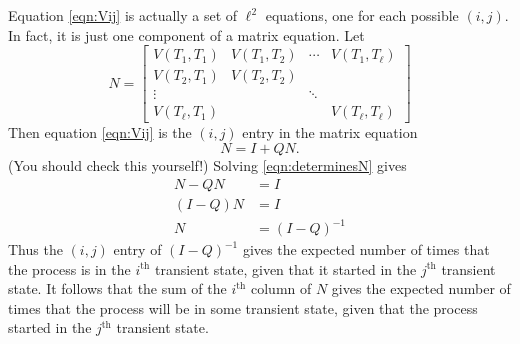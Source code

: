 \documentclass[reqno]{immbook}
\numberwithin{equation}{chapter}
\numberwithin{question}{section}
\numberwithin{theorem}{chapter}
\numberwithin{figure}{chapter}
\theoremstyle{definition}
\begin{document}
Equation \eqref{eqn:Vij} is actually a set of $\ell^2$ equations,
one for each possible $(i,j)$.  In fact, it is just one component
of a matrix equation.
Let
\begin{equation}
   N = \begin{bmatrix}
            V(T_1,T_1) & V(T_1,T_2) & \cdots & V(T_1,T_{\ell}) \\
	    V(T_2,T_1) & V(T_2,T_2) \\
	       \vdots  &  &   \ddots \\
	    V(T_{\ell},T_1) & & & V(T_{\ell},T_{\ell})
       \end{bmatrix}
\end{equation}
Then equation \eqref{eqn:Vij} is the $(i,j)$ entry in the
matrix equation
\begin{equation}
   N = I + QN.
\label{eqn:determinesN}
\end{equation}
(You should check this yourself!)
Solving \eqref{eqn:determinesN} gives
\begin{equation}
\begin{split}
  N-QN & = I \\
  (I-Q)N & = I \\
       N & = (I-Q)^{-1}
\end{split}
\end{equation}
Thus the $(i,j)$ entry of $(I-Q)^{-1}$ gives the expected number
of times that the process is in the $i^{\textrm{th}}$ transient
state, given that it started in the $j^{\textrm{th}}$
transient state.
It follows that the sum of the $i^{\textrm{th}}$ column of $N$
gives the expected number of times that the process will be in 
some transient state, given that the process started
in the $j^{\textrm{th}}$ transient state.
\end{document}
